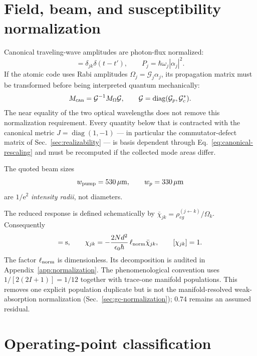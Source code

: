 \documentclass[11pt,a4paper]{article}
\newcommand{\e}{\mathrm e}
\newcommand{\chibar}{\bar\chi}
\begin{document}
\section{Field, beam, and susceptibility normalization}

Canonical traveling-wave amplitudes are photon-flux normalized:
\begin{equation}
[\delta\hat a_j(z,t),\delta\hat a_k^\dagger(z,t')]
=\delta_{jk}\delta(t-t'),\qquad
P_j=\hbar\omega_j|\alpha_j|^2 .
\label{eq:flux-normalization}
\end{equation}
If the atomic code uses Rabi amplitudes
$\Omega_j=\mathcal G_j\alpha_j$, its propagation matrix must be transformed
before being interpreted quantum mechanically:
\begin{equation}
M_{\rm can}=\mathcal G^{-1}M_{\Omega}\mathcal G,\qquad
\mathcal G=\operatorname{diag}(\mathcal G_p,\mathcal G_c^*).
\label{eq:canonical-rescaling}
\end{equation}
The near equality of the two optical wavelengths does not remove this
normalization requirement. Every quantity below that is contracted with the
canonical metric $J=\operatorname{diag}(1,-1)$ --- in particular the
commutator-defect matrix of Sec.~\ref{sec:realizability} --- is
basis dependent through Eq.~\eqref{eq:canonical-rescaling} and must be
recomputed if the collected mode areas differ.

The quoted beam sizes
\[
w_{\rm pump}=530\,\mu{\rm m},\qquad w_p=330\,\mu{\rm m}
\]
are $1/\e^2$ \emph{intensity radii}, not diameters.

The reduced response is defined schematically by
$\chibar_{jk}=\rho_{eg}^{(j\leftarrow k)}/\Omega_k$. Consequently
\begin{equation}
[\chibar_{jk}]={\rm s},\qquad
\chi_{jk}=-\frac{2Nd^2}{\epsilon_0\hbar}\,\ell_{\rm norm}\chibar_{jk},
\qquad [\chi_{jk}]=1 .
\label{eq:susceptibility-dimension}
\end{equation}
The factor $\ell_{\rm norm}$ is dimensionless. Its decomposition is audited
in Appendix~\ref{app:normalization}. The phenomenological convention uses
$1/[2(2I+1)]=1/12$ together with trace-one manifold populations. This removes
one explicit population duplicate but is not the manifold-resolved weak-absorption
normalization (Sec.~\ref{sec:gc-normalization}); $0.74$ remains an assumed residual.

\section{Operating-point classification}
\end{document}
